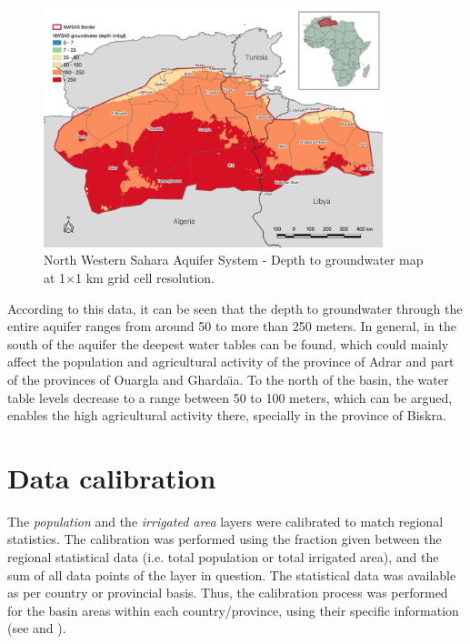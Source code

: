 \documentclass[12pt]{iopart}
\begin{document}
\begin{figure}[!ht]
	\centering
	\includegraphics[width=0.88\textwidth, cfbox=black 1pt 0pt]{NWSAS_Depth}
	\caption[NWSAS depth to groundwater map]{North Western Sahara Aquifer System - Depth to groundwater map at 1$\times$1 km grid cell resolution.}
	\label{fig:depth}
\end{figure}

According to this data, it can be seen that the depth to groundwater through the entire aquifer ranges from around 50 to more than 250 meters. In general, in the south of the aquifer the deepest water tables can be found, which could mainly affect the population and agricultural activity of the province of Adrar and part of the provinces of Ouargla and Gharda\"\i a. To the north of the basin, the water table levels decrease to a range between 50 to 100 meters, which can be argued, enables the high agricultural activity there, specially in the province of Biskra.
\vfill

\section{Data calibration}
The \textit{population} and the \textit{irrigated area} layers were calibrated to match regional statistics. The calibration was performed using the fraction given between the regional statistical data (i.e. total population or total irrigated area), and the sum of all data points of the layer in question. The statistical data was available as per country or provincial basis. Thus, the calibration process was performed for the basin areas within each country/province, using their specific information (see  and ).
\end{document}
